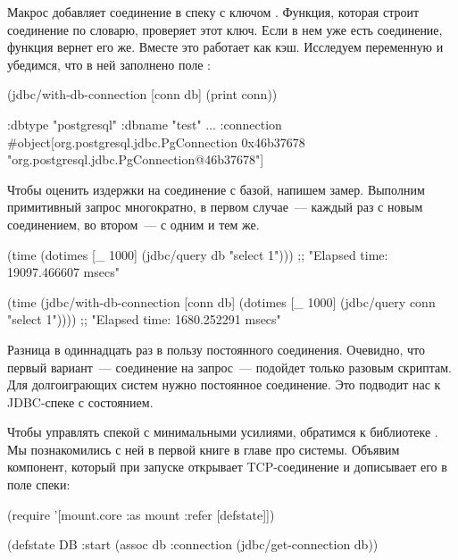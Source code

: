 Макрос добавляет соединение в спеку с ключом . Функция, которая строит соединение по словарю, проверяет этот ключ. Если в нем уже есть соединение, функция вернет его же. Вместе это работает как кэш. Исследуем переменную  и убедимся, что в ней заполнено поле :

\begin{english}
  \begin{clojure}
(jdbc/with-db-connection [conn db]
  (print conn))

{:dbtype "postgresql"
 :dbname "test"
 ...
 :connection #object[org.postgresql.jdbc.PgConnection 0x46b37678 "org.postgresql.jdbc.PgConnection@46b37678"]}
  \end{clojure}
\end{english}

Чтобы оценить издержки на соединение с базой, напишем замер. Выполним примитивный запрос многократно, в первом случае~--- каждый раз с новым соединением, во втором~--- с одним и тем же.

\begin{english}
  \begin{clojure}
(time (dotimes [_ 1000]
        (jdbc/query db "select 1")))
;; "Elapsed time: 19097.466607 msecs"

(time
 (jdbc/with-db-connection [conn db]
   (dotimes [_ 1000]
     (jdbc/query conn "select 1"))))
;; "Elapsed time: 1680.252291 msecs"
  \end{clojure}
\end{english}

Разница в одиннадцать раз в пользу постоянного соединения. Очевидно, что первый вариант~--- соединение на запрос~--- подойдет только разовым скриптам. Для долгоиграющих систем нужно постоянное соединение. Это подводит нас к JDBC-спеке с состоянием.

Чтобы управлять спекой с минимальными усилиями, обратимся к библиотеке . Мы познакомились с ней в первой книге в главе про системы. Объявим компонент, который при запуске открывает TCP-соединение и дописывает его в поле  спеки:

\begin{english}
  \begin{clojure}
(require '[mount.core :as mount :refer [defstate]])

(defstate DB
  :start
  (assoc db :connection
         (jdbc/get-connection db))
  \end{clojure}
\end{english}

